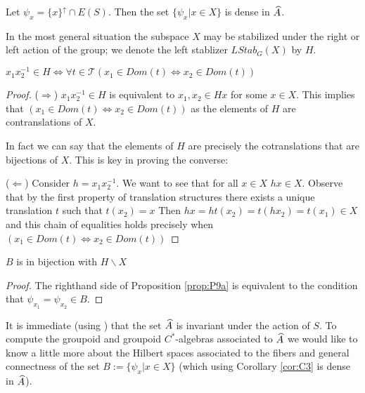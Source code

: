 \begin{corollary}
\begin{corollary}\label{cor:C3}
Let $\psi_{x} = \lbrace x \rbrace^{\uparrow} \cap E(S)$. Then the set $\lbrace \psi_{x} | x \in X \rbrace$ is dense in $\widehat{A}$.
\end{corollary}

In the most general situation the subspace $X$ may be stabilized under the right or left action of the group; we denote the left stablizer $LStab_{G}(X)$ by $H$. 

\begin{proposition}\label{prop:P9a}
$x_{1}x_{2}^{-1} \in H \Leftrightarrow \forall t \in \mathcal{T} (x_{1} \in Dom(t) \Leftrightarrow x_{2} \in Dom(t))$
\end{proposition}
\begin{proof}
($\Rightarrow$) $x_{1}x_{2}^{-1} \in H$ is equivalent to $x_{1}, x_{2} \in Hx$ for some $x \in X$. This implies that $(x_{1} \in Dom(t) \Leftrightarrow x_{2} \in Dom(t))$ as the elements of $H$ are contranslations of $X$. 

In fact we can say that the elements of $H$ are precisely the cotranslations that are bijections of $X$. This is key in proving the converse:

($\Leftarrow$) Consider $h=x_{1}x_{2}^{-1}$. We want to see that for all $x \in X$ $hx \in X$. Observe that by the first property of translation structures there exists a unique translation $t$ such that $t(x_{2})=x$ Then $hx=ht(x_{2})=t(hx_{2})=t(x_{1}) \in X$ and this chain of equalities holds precisely when $(x_{1} \in Dom(t) \Leftrightarrow x_{2} \in Dom(t))$

\end{proof}

\begin{corollary}\label{cor:C5}
$B$ is in bijection with $H \backslash X$
\end{corollary}
\begin{proof}
The righthand side of Proposition \ref{prop:P9a} is equivalent to the condition that $\psi_{x_{1}}=\psi_{x_{2}} \in B$.
\end{proof}

It is immediate (using \cite[Prop 10.10]{MR2419901}) that the set $\widehat{A}$ is invariant under the action of $S$. To compute the groupoid and groupoid $C^{*}$-algebras associated to $\widehat{A}$ we would like to know a little more about the Hilbert spaces associated to the fibers and general connectness of the set $B:=\lbrace \psi_{x} | x \in X \rbrace$ (which using Corollary \ref{cor:C3} is dense in $\widehat{A}$).


\end{corollary}
